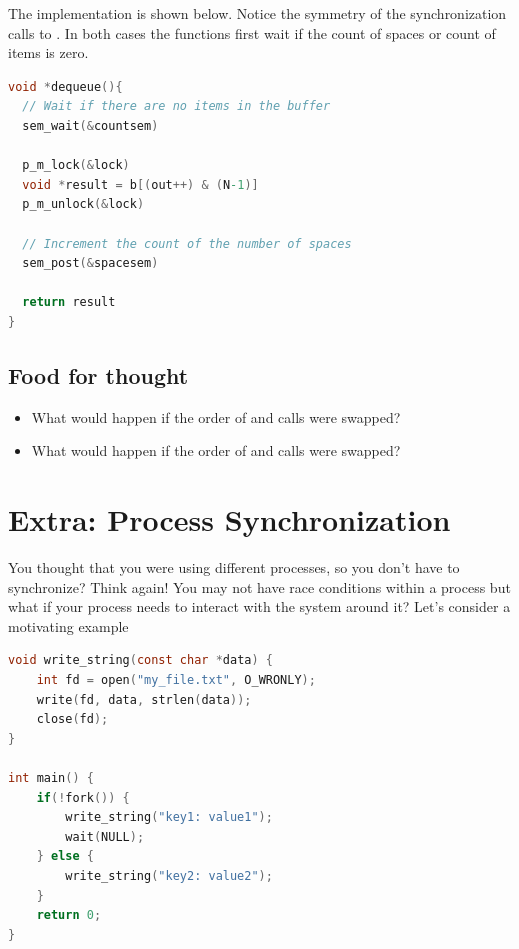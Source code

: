 The  implementation is shown below. Notice the symmetry of the synchronization calls to . In both cases the functions first wait if the count of spaces or count of items is zero.

\begin{lstlisting}[language=C]
void *dequeue(){
  // Wait if there are no items in the buffer
  sem_wait(&countsem)

  p_m_lock(&lock)
  void *result = b[(out++) & (N-1)]
  p_m_unlock(&lock)

  // Increment the count of the number of spaces
  sem_post(&spacesem)

  return result
}
\end{lstlisting}

\subsection{Food for thought}\label{food-for-thought}

\begin{itemize}
\tightlist
\item
  What would happen if the order of  and  calls were swapped?
\item
  What would happen if the order of  and  calls were swapped?
\end{itemize}


\section{Extra: Process Synchronization}\label{process-synchronization}

You thought that you were using different processes, so you don't have to synchronize? Think again! You may not have race conditions within a process but what if your process needs to interact with the system around it? Let's consider a motivating example

\begin{lstlisting}[language=C]
void write_string(const char *data) {
    int fd = open("my_file.txt", O_WRONLY);
    write(fd, data, strlen(data));
    close(fd);
}

int main() {
    if(!fork()) {
        write_string("key1: value1");
        wait(NULL);
    } else {
        write_string("key2: value2");
    }
    return 0;
}
\end{lstlisting}

